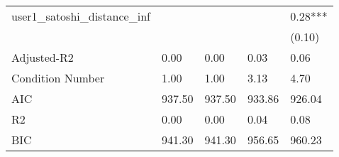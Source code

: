 \begin{table}
\begin{center}
\begin{tabular}{lllll}
user1_satoshi_distance_inf            &        &        &         & 0.28***   \\
                                      &        &        &         & (0.10)    \\
Adjusted-R2                           & 0.00   & 0.00   & 0.03    & 0.06      \\
Condition Number                      & 1.00   & 1.00   & 3.13    & 4.70      \\
AIC                                   & 937.50 & 937.50 & 933.86  & 926.04    \\
R2                                    & 0.00   & 0.00   & 0.04    & 0.08      \\
BIC                                   & 941.30 & 941.30 & 956.65  & 960.23    \\
\hline
\end{tabular}
\end{center}
\end{table}